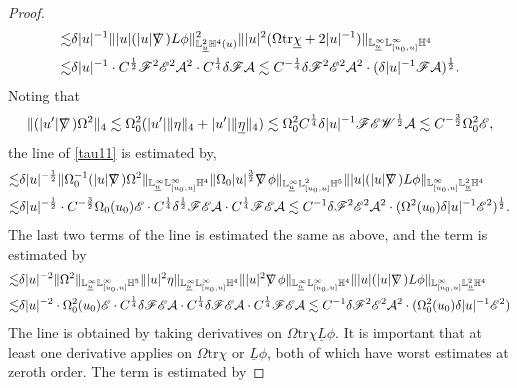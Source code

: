 \documentclass[11pt,reqno]{amsart}
\theoremstyle{definition}
\numberwithin{equation}{section}
\newcommand{\tr}{\mathrm{tr}}
\renewcommand{\L}{\mathbb{L}}
\renewcommand{\H}{\mathbb{H}}
\def\chib{\underline{\chi}}
\def\etab{\underline{\eta}}
\def\Lb{\underline{L}}
\def\tr{\mathrm{tr}}
\def\ub{\underline{u}}
\def\nablas{\mbox{$\nabla \mkern -13mu /$ }}
\begin{document}
\begin{proof}
\begin{align*}
\lesssim& \delta|u|^{-1}\||u|(|u|\nablas)L\phi\|^2_{\L^2_{\ub}\H^4(u)}\||u|^2(\Omega\tr\chib+2|u|^{-1})\|_{\L^\infty_{\ub}\L^\infty_{[u_0,u]}\H^4}\\
\lesssim&\delta|u|^{-1}\cdot C^{\frac{1}{2}}\mathscr{F}^2\mathscr{E}^2\mathcal{A}^2\cdot C^{\frac{1}{4}}\delta\mathscr{F}\mathcal{A}
\lesssim C^{-\frac{1}{4}}\delta\mathscr{F}^2\mathscr{E}^2\mathcal{A}^2\cdot(\delta|u|^{-1}\mathscr{F}\mathcal{A})^{\frac{1}{2}}.
\end{align*}
Noting that
\begin{equation}\label{estimate-Omega5}\|(|u'|\nablas)\Omega^2\|_4\lesssim\Omega_0^2(|u'|\|\eta\|_4+|u'|\|\etab\|_4)\lesssim\Omega_0^2 C^{\frac{1}{4}}\delta|u|^{-1}\mathscr{F}\mathscr{E}\mathscr{W}^{\frac{1}{2}}\mathcal{A}\lesssim C^{-\frac{3}{2}} \Omega_0^2\mathscr{E},\end{equation}
the  line of \eqref{tau11} is estimated by,
\begin{align*}
\lesssim&\delta|u|^{-\frac{1}{2}}\|\Omega_0^{-1}(|u|\nablas)\Omega^2\|_{\L^\infty_{\ub}\L^\infty_{[u_0,u]}\H^4}\|\Omega_0|u|^{\frac{3}{2}}\nablas\phi\|_{\L^\infty_{\ub}\L^2_{[u_0,u]}\H^5}\||u|(|u|\nablas)L\phi\|_{\L^\infty_{[u_0,u]}\L^2_{\ub}\H^4}\\
\lesssim&\delta|u|^{-\frac{1}{2}}\cdot C^{-\frac{3}{2}}\Omega_0(u_0)\mathscr{E}\cdot C^{\frac{1}{4}}\delta^{\frac{1}{2}}\mathscr{F}\mathscr{E}\mathcal{A}\cdot C^{\frac{1}{4}}\mathscr{F}\mathscr{E}\mathcal{A}
\lesssim C^{-1}\delta\mathscr{F}^2\mathscr{E}^2\mathcal{A}^2\cdot(\Omega^2(u_0)\delta|u|^{-1}\mathscr{E}^2)^{\frac{1}{2}}.
\end{align*}
The last two terms of the  line is estimated the same as above, and the  term is estimated by
\begin{align*}
\lesssim&\delta|u|^{-2}\|\Omega^2\|_{\L^\infty_{\ub}\L^\infty_{[u_0,u]}\H^5}\||u|^2\eta\|_{\L^\infty_{\ub}\L^\infty_{[u_0,u]}\H^4}\||u|^2\nablas\phi\|_{\L^\infty_{\ub}\L^\infty_{[u_0,u]}\H^4}\||u|(|u|\nablas)L\phi\|_{\L^\infty_{[u_0,u]}\L^2_{\ub}\H^4}\\
\lesssim&\delta|u|^{-2}\cdot \Omega_0^2(u_0)\mathscr{E}\cdot C^{\frac{1}{4}}\delta\mathscr{F}\mathscr{E}\mathcal{A}\cdot C^{\frac{1}{4}}\delta\mathscr{F}\mathscr{E}\mathcal{A}\cdot C^{\frac{1}{4}}\mathscr{F}\mathscr{E}\mathcal{A}
\lesssim C^{-1}\delta\mathscr{F}^2\mathscr{E}^2\mathcal{A}^2\cdot(\Omega_0^2(u_0)\delta|u|^{-1}\mathscr{E}^2)
\end{align*}
The  line is obtained by taking derivatives on $\Omega\tr\chi\Lb\phi$. It is important that at least one derivative applies on $\Omega\tr\chi$ or $\Lb\phi$, both of which have worst estimates at zeroth order. The  term is estimated by

\end{proof}
\end{document}
